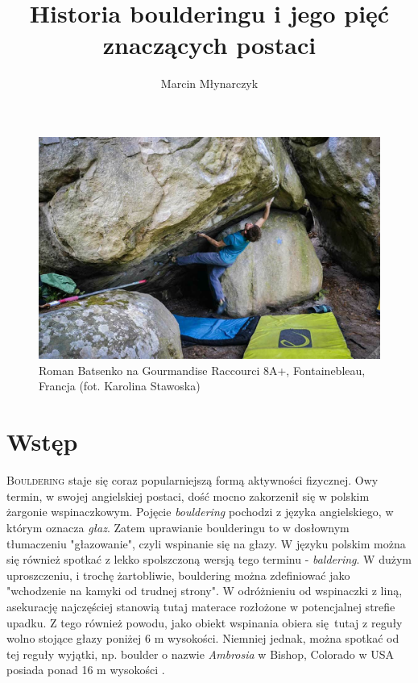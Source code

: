 \documentclass{article}
\title{Historia boulderingu i jego pięć znaczących postaci}
\author{Marcin Młynarczyk}
\date{\displaydate{date}}
\begin{document}
\maketitle
\tableofcontents

\bigskip

\begin{figure}[!htbp]
	\begin{center}
		\includegraphics[width=0.7\linewidth]{images/intro.eps}
	\end{center}
	\caption{Roman Batsenko na Gourmandise Raccourci 8A+, Fontainebleau, Francja (fot. Karolina Stawoska) \cite{8a}}
\end{figure}

\section{Wstęp}
\lettrine[lines=2]{B}{ouldering} staje się coraz popularniejszą formą aktywności fizycznej. Owy termin, w swojej angielskiej postaci, dość mocno zakorzenił się w polskim żargonie wspinaczkowym. Pojęcie \textit{bouldering} pochodzi z języka angielskiego, w którym oznacza \textit{głaz}. Zatem uprawianie boulderingu to w dosłownym tłumaczeniu "głazowanie", czyli wspinanie się na głazy. W języku polskim można się również spotkać z lekko spolszczoną wersją tego terminu - \textit{baldering}. W dużym uproszczeniu, i trochę żartobliwie, bouldering można zdefiniować jako "wchodzenie na kamyki od trudnej strony". W odróżnieniu od wspinaczki z liną, asekurację najczęściej stanowią tutaj materace rozłożone w potencjalnej strefie upadku. Z tego również powodu, jako obiekt wspinania obiera się tutaj z reguły wolno stojące głazy poniżej 6 m wysokości. Niemniej jednak, można spotkać od tej reguły wyjątki, np. boulder o nazwie \textit{Ambrosia} w Bishop, Colorado w USA posiada ponad 16 m wysokości \cite{ambrosia}.
\end{document}
